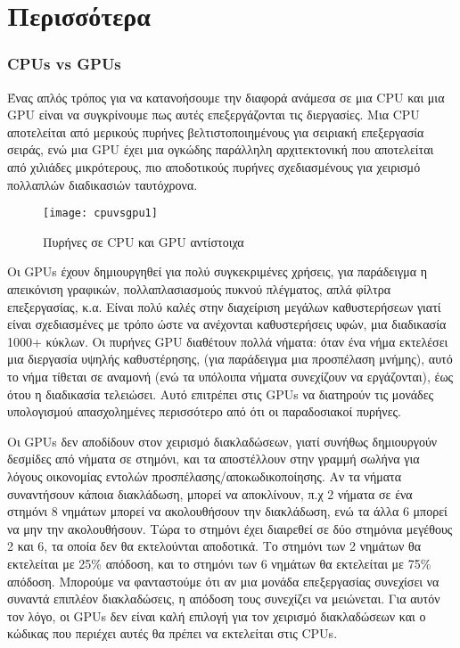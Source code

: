 \chapter{Περισσότερα}

\subsection{CPUs vs GPUs}

Ένας απλός τρόπος για να κατανοήσουμε την διαφορά ανάμεσα σε μια CPU και μια GPU είναι να συγκρίνουμε πως αυτές επεξεργάζονται τις διεργασίες. Μια CPU αποτελείται από μερικούς πυρήνες βελτιστοποιημένους για σειριακή επεξεργασία σειράς, ενώ μια GPU έχει μια ογκώδης παράλληλη αρχιτεκτονική που αποτελείται από χιλιάδες μικρότερους, πιο αποδοτικούς πυρήνες σχεδιασμένους για χειρισμό πολλαπλών διαδικασιών ταυτόχρονα.

\begin{figure}[h]
\centering
\texttt{[image: cpuvsgpu1]}
\caption{Πυρήνες σε CPU και GPU αντίστοιχα}
\end{figure}

Οι GPUs έχουν δημιουργηθεί για πολύ συγκεκριμένες χρήσεις, για παράδειγμα η απεικόνιση γραφικών, πολλαπλασιασμούς πυκνού πλέγματος, απλά φίλτρα επεξεργασίας, κ.α. Είναι πολύ καλές στην διαχείριση μεγάλων καθυστερήσεων γιατί είναι σχεδιασμένες με τρόπο ώστε να ανέχονται καθυστερήσεις υφών, μια διαδικασία 1000+ κύκλων. Οι πυρήνες GPU διαθέτουν πολλά νήματα: όταν ένα νήμα εκτελέσει μια διεργασία υψηλής καθυστέρησης, (για παράδειγμα μια προσπέλαση μνήμης), αυτό το νήμα τίθεται σε αναμονή (ενώ τα υπόλοιπα νήματα συνεχίζουν να εργάζονται), έως ότου η διαδικασία τελειώσει. Αυτό επιτρέπει στις GPUs να διατηρούν τις μονάδες υπολογισμού απασχολημένες περισσότερο από ότι οι παραδοσιακοί πυρήνες.

Οι GPUs δεν αποδίδουν στον χειρισμό διακλαδώσεων, γιατί συνήθως δημιουργούν δεσμίδες από νήματα σε στημόνι, και τα αποστέλλουν στην γραμμή σωλήνα για λόγους οικονομίας εντολών προσπέλασης/αποκωδικοποίησης. Αν τα νήματα συναντήσουν κάποια διακλάδωση, μπορεί να αποκλίνουν, π.χ 2 νήματα σε ένα στημόνι 8 νημάτων μπορεί να ακολουθήσουν την διακλάδωση, ενώ τα άλλα 6 μπορεί να μην την ακολουθήσουν. Τώρα το στημόνι έχει διαιρεθεί σε δύο στημόνια μεγέθους 2 και 6, τα οποία δεν θα εκτελούνται αποδοτικά. Το στημόνι των 2 νημάτων θα εκτελείται με 25\% απόδοση, και το στημόνι των 6 νημάτων θα εκτελείται με 75\% απόδοση. Μπορούμε να φανταστούμε ότι αν μια μονάδα επεξεργασίας συνεχίσει να συναντά επιπλέον διακλαδώσεις, η απόδοση τους συνεχίζει να μειώνεται. Για αυτόν τον λόγο, οι GPUs δεν είναι καλή επιλογή για τον χειρισμό διακλαδώσεων και ο κώδικας που περιέχει αυτές θα πρέπει να εκτελείται στις CPUs.

